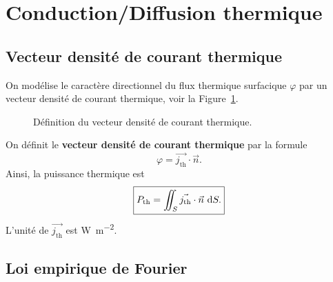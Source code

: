 \section{Conduction/Diffusion thermique}

    \subsection{Vecteur densité de courant thermique}

        On modélise le caractère directionnel du flux thermique surfacique $\varphi$ par un vecteur densité de courant thermique, voir la Figure~\ref{fig:vecteur_densite_courant_thermique}.

        \begin{figure}
            \centering
            \caption{Définition du vecteur densité de courant thermique.}    
            \label{fig:vecteur_densite_courant_thermique}
        \end{figure}

        \begin{definition}
            On définit le \textbf{vecteur densité de courant thermique} par la formule
            \begin{equation*}
                \varphi=\vec{j_{\text{th}}}\cdot\vec{n}.
            \end{equation*}
            Ainsi, la puissance thermique est
            \begin{equation*}
                \boxed{
                    P_{\text{th}}=\iint_{S}\vec{j_{\text{th}}}\cdot\vec{n}~\mathrm{d} S.
                }
            \end{equation*}
            L'unité de $\vec{j_{\text{th}}}$ est \si{\watt\per\metre\squared}.
        \end{definition}

    \subsection{Loi empirique de Fourier}

